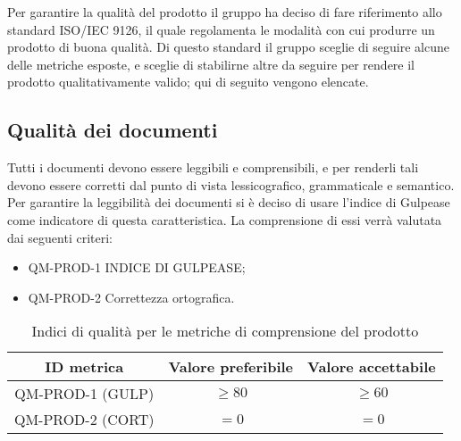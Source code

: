 \documentclass[../piano_di_qualifica.tex]{subfiles}
\begin{document}
Per garantire la qualità del prodotto il gruppo ha deciso di fare riferimento allo standard
ISO/IEC 9126, il quale regolamenta le modalità con cui produrre un prodotto di buona qualità. Di questo standard il gruppo sceglie di seguire alcune delle metriche esposte, e sceglie di stabilirne altre da seguire per rendere il prodotto qualitativamente valido; qui di seguito vengono elencate.

\subsection{Qualità dei documenti}
\label{sub:qual_doc}
Tutti i documenti devono essere leggibili e comprensibili, e per renderli tali devono essere corretti dal punto di vista lessicografico, grammaticale e semantico.
Per garantire la leggibilità dei documenti si è deciso di usare l’indice di Gulpease come indicatore di questa caratteristica. La comprensione di essi verrà valutata dai seguenti criteri:
\begin{itemize}
\item QM-PROD-1 INDICE DI GULPEASE;
\item QM-PROD-2 Correttezza ortografica.
\end{itemize}


\begin{table}[!ht]
\centering
\begin{tabular}{|c|c|c|}
		\hline
		\rowcolor{lightgray}
		\textbf{ID metrica} & \textbf{Valore preferibile} & \textbf{Valore accettabile} \\
		\hline 
		QM-PROD-1 (GULP) & \(\ge 80\) & \(\ge 60\) \\
 		\hline
		QM-PROD-2 (CORT) & \(= 0\) & \(= 0\) \\
		\hline
\end{tabular}
\caption{Indici di qualità per le metriche di comprensione del prodotto}
\end{table}
\end{document}
